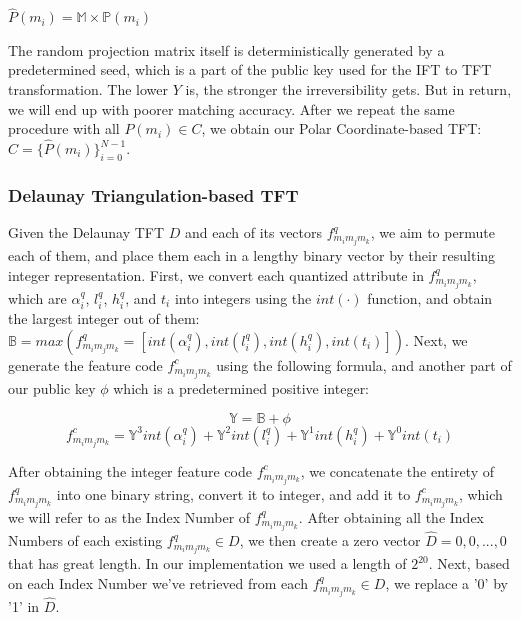 \documentclass[fyp]{socreport}
\begin{document}
\begin{center}
	$\widehat{P}(m_i) = \mathbb{M} \times \mathbb{P}(m_i)$
\end{center}

 The random projection matrix itself is deterministically generated by a predetermined seed, which is a part of the public key used for the IFT to TFT transformation. The lower $Y$ is, the stronger the irreversibility gets. But in return, we will end up with poorer matching accuracy. After we repeat the same procedure with all $P(m_i) \in C$, we obtain our Polar Coordinate-based TFT: $\widehat{C} = \{\widehat{P}(m_i)\}^{N-1}_{i=0}$.

\subsubsection{Delaunay Triangulation-based TFT}
Given the Delaunay TFT $D$ and each of its vectors $f^q_{m_im_jm_k}$, we aim to permute each of them, and place them each in a lengthy binary vector by their resulting integer representation. First, we convert each quantized attribute in $f^q_{m_im_jm_k}$, which are $\alpha^q_i$, $l^q_i$, $h^q_i$, and $t_i$ into integers using the $int(\cdot)$ function, and obtain the largest integer out of them: $\mathbb{B} = max(f^q_{m_im_jm_k} = [int(\alpha^q_i), int(l^q_i), int(h^q_i), int(t_i)])$. Next, we generate the feature code $f^c_{m_im_jm_k}$ using the following formula, and another part of our public key $\phi$ which is a predetermined positive integer:

\begin{equation}
	\mathbb{Y} = \mathbb{B} + \phi
\end{equation}
\begin{equation}
	f^c_{m_im_jm_k} = \mathbb{Y}^3 int(\alpha^q_i) + \mathbb{Y}^2 int(l^q_i) + \mathbb{Y}^1 int(h^q_i) + \mathbb{Y}^0 int(t_i)
\end{equation}

After obtaining the integer feature code $f^c_{m_im_jm_k}$, we concatenate the entirety of $f^q_{m_im_jm_k}$ into one binary string, convert it to integer, and add it to $f^c_{m_im_jm_k}$, which we will refer to as the Index Number of $f^q_{m_im_jm_k}$. After obtaining all the Index Numbers of each existing $f^q_{m_im_jm_k} \in D$, we then create a zero vector $\widehat{D} = {0,0,...,0}$ that has great length. In our implementation we used a length of $2^{20}$. Next, based on each Index Number we've retrieved from each $f^q_{m_im_jm_k} \in D$, we replace a '0' by '1' in $\widehat{D}$. 
\end{document}
